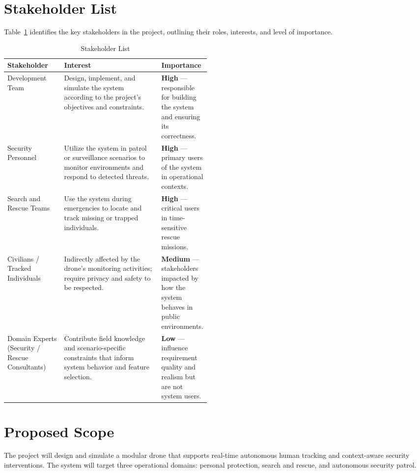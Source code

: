 \documentclass[12pt,a4paper]{report}
\begin{document}
\section{Stakeholder List}
Table~\ref{tab:stakeholders} identifies the key stakeholders in the project, outlining their roles, interests, and level of importance.

\begin{table}[h!]
\centering
\begin{tabularx}{\linewidth}{|>{\raggedright\arraybackslash}p{0.28\linewidth}|
                                    >{\raggedright\arraybackslash}X|
                                    >{\raggedright\arraybackslash}p{0.20\linewidth}|}
\hline
\textbf{Stakeholder} & \textbf{Interest} & \textbf{Importance} \\
\hline
Development Team & Design, implement, and simulate the system according to the project's objectives and constraints. & \textbf{High} — responsible for building the system and ensuring its correctness. \\
\hline
Security Personnel & Utilize the system in patrol or surveillance scenarios to monitor environments and respond to detected threats. & \textbf{High} — primary users of the system in operational contexts. \\
\hline
Search and Rescue Teams & Use the system during emergencies to locate and track missing or trapped individuals. & \textbf{High} — critical users in time-sensitive rescue missions. \\
\hline
Civilians / Tracked Individuals & Indirectly affected by the drone's monitoring activities; require privacy and safety to be respected. & \textbf{Medium} — stakeholders impacted by how the system behaves in public environments. \\
\hline
Domain Experts (Security / Rescue Consultants) & Contribute field knowledge and scenario-specific constraints that inform system behavior and feature selection. & \textbf{Low} — influence requirement quality and realism but are not system users. \\
\hline
\end{tabularx}
\caption{Stakeholder List}
\label{tab:stakeholders}
\end{table}


\section{Proposed Scope}

The project will design and simulate a modular drone that supports real-time autonomous human tracking and context-aware security interventions. The system will target three operational domains: personal protection, search and rescue, and autonomous security patrol.
\end{document}
